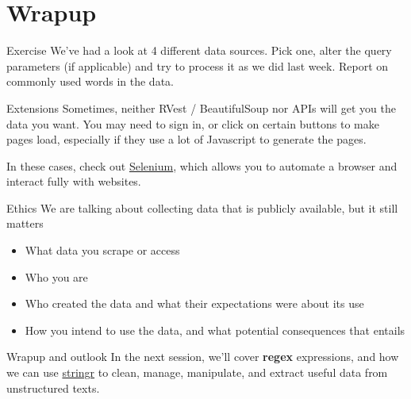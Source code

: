 \documentclass[
  10pt,
  ignorenonframetext,
  aspectratio=169]{beamer}
\newif\ifbibliography
\begin{document}
\hypertarget{wrapup}{%
\section{Wrapup}\label{wrapup}}

\begin{frame}{Exercise}
\protect\hypertarget{exercise-1}{}
We've had a look at 4 different data sources. Pick one, alter the query
parameters (if applicable) and try to process it as we did last week.
Report on commonly used words in the data.
\end{frame}

\begin{frame}{Extensions}
\protect\hypertarget{extensions}{}
Sometimes, neither RVest / BeautifulSoup nor APIs will get you the data
you want. You may need to sign in, or click on certain buttons to make
pages load, especially if they use a lot of Javascript to generate the
pages.

In these cases, check out \href{https://www.selenium.dev/}{Selenium},
which allows you to automate a browser and interact fully with websites.
\end{frame}

\begin{frame}{Ethics}
\protect\hypertarget{ethics}{}
We are talking about collecting data that is publicly available, but it
still matters

\begin{itemize}
  \item<1->What data you scrape or access
  \item<2->Who you are
  \item<3->Who created the data and what their expectations were about its use
  \item<4->How you intend to use the data, and what potential consequences that entails
\end{itemize}


\end{frame}

\begin{frame}{Wrapup and outlook}
\protect\hypertarget{wrapup-and-outlook}{}
In the next session, we'll cover \textbf{regex} expressions, and how we
can use
\href{https://journal.r-project.org/archive/2010/RJ-2010-012/RJ-2010-012.pdf}{stringr}
to clean, manage, manipulate, and extract useful data from unstructured
texts.
\end{frame}

\begin{frame}[allowframebreaks]{}
  \bibliographytrue
  
\end{frame}
\end{document}
